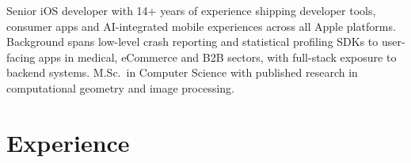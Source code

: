 \documentclass[11pt,a4paper,sans]{moderncv} %
\begin{document}




\makecvtitle 

\hspace{1em} Senior iOS developer with 14+ years of experience shipping developer tools, consumer apps and AI-integrated mobile experiences across all Apple platforms. Background spans low-level crash reporting and statistical profiling SDKs to user-facing apps in medical, eCommerce and B2B sectors, with full-stack exposure to backend systems. M.Sc.\ in Computer Science with published research in computational geometry and image processing.

\vspace{1em}

\section{Experience}
\end{document}
